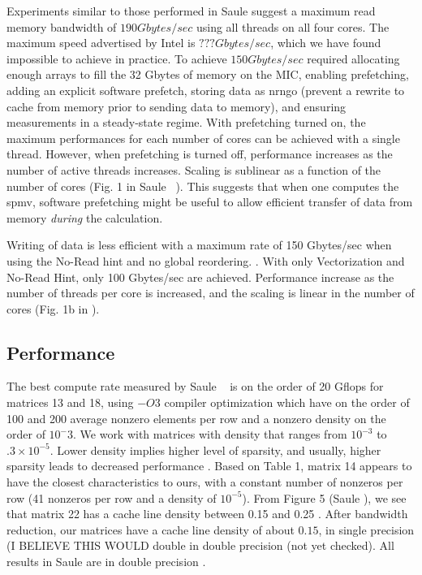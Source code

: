 Experiments similar to those performed in Saule \etal \cite{} suggest a maximum read  memory bandwidth of $190 Gbytes/sec$ using all threads on all four cores. The maximum speed advertised by Intel is $??? Gbytes/sec$, which we have found impossible to achieve in practice. To achieve $150 Gbytes/sec$ required allocating enough arrays to fill the 32 Gbytes of memory on the MIC, enabling prefetching, adding an explicit software prefetch, storing data as nrngo (prevent a rewrite to cache from memory prior to sending data to memory), and ensuring measurements in a steady-state regime.  With prefetching turned on, the maximum performances for each number of cores can be achieved with a single thread. However, when prefetching is turned off, performance increases as the number of active threads increases. Scaling is sublinear as a function of the number of cores (Fig. 1 in Saule \etal~\cite{}).  This suggests that when one computes the spmv, software prefetching might be useful to allow efficient transfer of data from memory {\em during\/} the calculation. 

Writing of data is less efficient with a maximum rate of 150 Gbytes/sec when using the No-Read hint and  no global reordering. .
With only Vectorization and No-Read Hint, only 100 Gbytes/sec are achieved. Performance increase as the number of threads per core is increased, and the scaling is linear in the number of cores (Fig. 1b in \cite{Saule}). 


\subsection{Performance}
The best compute rate measured by Saule \etal~\cite{} is on the order of 20 Gflops for matrices 13 and 18, using $-O3$ compiler optimization  which have on the order of 100 and 200 average nonzero elements per row and a nonzero density on the order of $10^-3$. We work with matrices with density that ranges from $10^{-3}$ to $.3\times 10^{-5}$.  Lower density implies higher level of sparsity, and usually, higher sparsity leads to decreased performance . Based on Table 1, matrix 14 appears to have the closest characteristics to ours, with a constant number of nonzeros per row (41 nonzeros per row and a density of $10^{-5}$). From Figure 5 (Saule \etal), we see that matrix 22 has a cache line density between 0.15 and 0.25 . After bandwidth reduction, our matrices have a cache line density of about $0.15$, in single precision (I BELIEVE THIS WOULD double in double precision (not yet checked). All results in Saule \etal are in double precision . 

